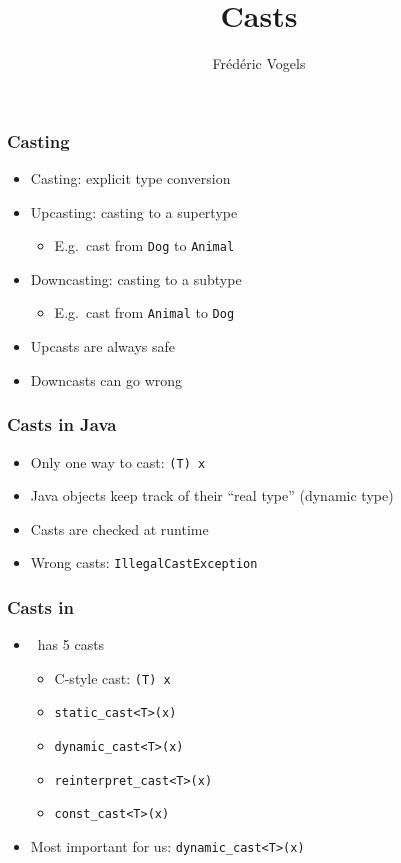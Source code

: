 \documentclass{../ucll-slides}
\title{Casts}
\author{Fr\'ed\'eric Vogels}
\begin{document}
\begin{frame}
  \titlepage
\end{frame}

\begin{frame}
  \frametitle{Casting}
  \begin{itemize}
    \item Casting: explicit type conversion
    \item Upcasting: casting to a supertype
          \begin{itemize}
            \item E.g.\ cast from {\tt Dog} to {\tt Animal}
          \end{itemize}
    \item Downcasting: casting to a subtype
          \begin{itemize}
            \item E.g.\ cast from {\tt Animal} to {\tt Dog}
          \end{itemize}
    \item Upcasts are always safe
    \item Downcasts can go wrong
  \end{itemize}
\end{frame}

\begin{frame}
  \frametitle{Casts in Java}
  \begin{itemize}
    \item Only one way to cast: {\tt (T) x}
    \item Java objects keep track of their ``real type'' (dynamic type)
    \item Casts are checked at runtime
    \item Wrong casts: {\tt IllegalCastException}
  \end{itemize}
\end{frame}

\begin{frame}
  \frametitle{Casts in \cpp}
  \begin{itemize}
    \item \cpp~has 5 casts
          \begin{itemize}
            \item C-style cast: {\tt (T) x}
            \item {\tt static\_cast<T>(x)}
            \item {\tt dynamic\_cast<T>(x)}
            \item {\tt reinterpret\_cast<T>(x)}
            \item {\tt const\_cast<T>(x)}
          \end{itemize}
    \item Most important for us: {\tt dynamic\_cast<T>(x)}
  \end{itemize}
\end{frame}
\end{document}
